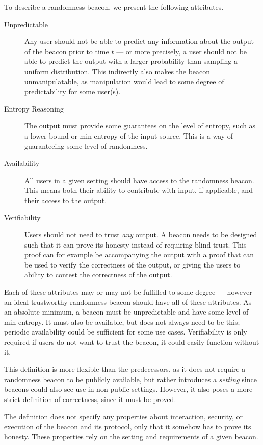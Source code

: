 To describe a randomness beacon, we present the following attributes.

\begin{description}
    \item[Unpredictable]
        Any user should not be able to predict any information about the output of the beacon prior to time $t$ --- or more precisely, a user should not be able to predict the output with a larger probability than sampling a uniform distribution.
        This indirectly also makes the beacon unmanipulatable, as manipulation would lead to some degree of predictability for some user(s).
    \item[Entropy Reasoning]
		The output must provide some guarantees on the level of entropy, such as a lower bound or min-entropy of the input source.
        This is a way of guaranteeing some level of randomness.
    \item[Availability]
        All users in a given setting should have access to the randomness beacon.
        This means both their ability to contribute with input, if applicable, and their access to the output.
    \item[Verifiability]
        Users should not need to trust \emph{any} output.
        A beacon needs to be designed such that it can prove its honesty instead of requiring blind trust.
        This proof can for example be accompanying the output with a proof that can be used to verify the correctness of the output, or giving the users to ability to contest the correctness of the output.
\end{description}

Each of these attributes may or may not be fulfilled to some degree --- however an ideal trustworthy randomness beacon should have all of these attributes. As an absolute minimum, a beacon must be unpredictable and have some level of min-entropy. It must also be available, but does not always need to be this; periodic availability could be sufficient for some use cases. Verifiability is only required if users do not want to trust the beacon, it could easily function without it.

This definition is more flexible than the predecessors, as it does not require a randomness beacon to be publicly available, but rather introduces a \emph{setting} since beacons could also see use in non-public settings.
However, it also poses a more strict definition of correctness, since it must be proved.

The definition does not specify any properties about interaction, security, or execution of the beacon and its protocol, only that it somehow has to prove its honesty.
These properties rely on the setting and requirements of a given beacon.
